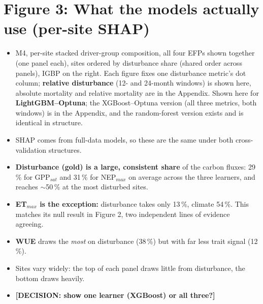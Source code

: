 \documentclass[11pt,a4paper]{article}
\newcommand{\decide}[1]{\textcolor{red!75!black}{\textbf{[DECISION: #1]}}}
\begin{document}
\section*{Figure 3: What the models actually use (per-site SHAP)}
\begin{itemize}
  \item M4, per-site stacked driver-group composition, all four EFPs shown together (one panel each),
        sites ordered by disturbance share (shared order across panels), IGBP on the right. Each figure
        fixes one disturbance metric's dot column; \textbf{relative disturbance} (12- and 24-month
        windows) is shown here, absolute mortality and relative mortality are in the Appendix.
        Shown here for \textbf{LightGBM--Optuna}; the XGBoost--Optuna version (all three metrics,
        both windows) is in the Appendix, and the random-forest version exists and is identical
        in structure.
  \item SHAP comes from full-data models, so these are the same under both cross-validation structures.
  \item \textbf{Disturbance (gold) is a large, consistent share} of the carbon fluxes: 29\,\% for
        GPP$_{sat}$ and 31\,\% for NEP$_{max}$ on average across the three learners, and reaches
        $\sim$50\,\% at the most disturbed sites.
  \item \textbf{ET$_{max}$ is the exception:} disturbance takes only 13\,\%, climate 54\,\%. This matches its
        null result in Figure 2, two independent lines of evidence agreeing.
  \item \textbf{WUE} draws the \emph{most} on disturbance (38\,\%) but with far less trait signal (12\,\%).
  \item Sites vary widely: the top of each panel draws little from disturbance, the bottom draws heavily.
  \item \decide{show one learner (XGBoost) or all three?}
\end{itemize}
\end{document}
